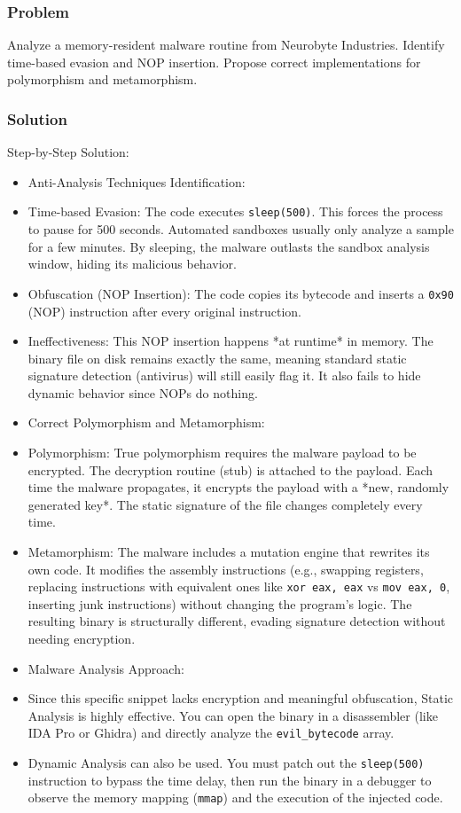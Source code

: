 \documentclass{article}
\begin{document}
\subsubsection*{Problem}
Analyze a memory-resident malware routine from Neurobyte Industries. Identify time-based evasion and NOP insertion. Propose correct implementations for polymorphism and metamorphism.

\subsubsection*{Solution}
Step-by-Step Solution:

\begin{itemize}
    \item[\textbf{1.}] Anti-Analysis Techniques Identification:
    \item Time-based Evasion: The code executes \texttt{sleep(500)}. This forces the process to pause for 500 seconds. Automated sandboxes usually only analyze a sample for a few minutes. By sleeping, the malware outlasts the sandbox analysis window, hiding its malicious behavior.
    \item Obfuscation (NOP Insertion): The code copies its bytecode and inserts a \texttt{0x90} (NOP) instruction after every original instruction.
    \item Ineffectiveness: This NOP insertion happens *at runtime* in memory. The binary file on disk remains exactly the same, meaning standard static signature detection (antivirus) will still easily flag it. It also fails to hide dynamic behavior since NOPs do nothing.

    \item[\textbf{2.}] Correct Polymorphism and Metamorphism:
    \item Polymorphism: True polymorphism requires the malware payload to be encrypted. The decryption routine (stub) is attached to the payload. Each time the malware propagates, it encrypts the payload with a *new, randomly generated key*. The static signature of the file changes completely every time.
    \item Metamorphism: The malware includes a mutation engine that rewrites its own code. It modifies the assembly instructions (e.g., swapping registers, replacing instructions with equivalent ones like \texttt{xor eax, eax} vs \texttt{mov eax, 0}, inserting junk instructions) without changing the program's logic. The resulting binary is structurally different, evading signature detection without needing encryption.

    \item[\textbf{3.}] Malware Analysis Approach:
    \item Since this specific snippet lacks encryption and meaningful obfuscation, Static Analysis is highly effective. You can open the binary in a disassembler (like IDA Pro or Ghidra) and directly analyze the \texttt{evil\_bytecode} array.
    \item Dynamic Analysis can also be used. You must patch out the \texttt{sleep(500)} instruction to bypass the time delay, then run the binary in a debugger to observe the memory mapping (\texttt{mmap}) and the execution of the injected code.
\end{itemize}
\end{document}
